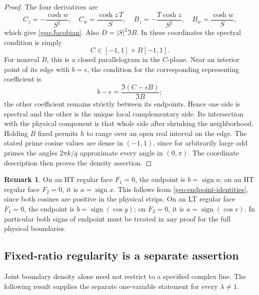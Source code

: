 \documentclass[11pt]{article}
\numberwithin{equation}{section}
\theoremstyle{definition}
\newtheorem{remark}[theorem]{Remark}
\begin{document}
\begin{proof}
The four derivatives are
\[
 C_z=-\frac{\cosh w}{S^2},\quad
 C_w=\frac{\cosh z\,T}{S},\quad
 B_z=-\frac{T\cosh z}{S^2},\quad
 B_w=\frac{\cosh w}{S},
\]
which give \eqref{geo:Jacobian}.
Also \(D=|S|^2\Im B\).  In these coordinates the spectral
condition is simply
\[
                         C\in[-1,1]+B[-1,1].
\]
For nonreal \(B\), this is a closed parallelogram in the
\(C\)-plane.  Near an interior point of its edge with
\(b=\epsilon\), the condition for the corresponding
representing coefficient is
\[
          b-\epsilon=\frac{\Im(C-\epsilon B)}{\Im B};
\]
the other coefficient remains strictly between its
endpoints.  Hence one side is spectral and the other
is the unique local complementary side.  Its intersection
with the physical component is that whole side after
shrinking the neighborhood.
Holding \(B\) fixed permits \(h\) to range over an open
real interval on the edge.  The stated prime cosine
values are dense in \((-1,1)\), since for arbitrarily
large odd primes the angles \(2\pi k/q\) approximate
every angle in \((0,\pi)\).  The coordinate description
then proves the density assertion.
\end{proof}

\begin{remark}\label{geo:endpoint-signs}
On an HT regular face \(F_1=0\), the endpoint is
\(b=\operatorname{sign}u\); on an HT regular face \(F_2=0\),
it is \(a=\operatorname{sign}x\).
This follows from \eqref{geo:endpoint-identities}, since
both cosines are positive in the physical strips.
On an LT regular face \(F_1=0\), the endpoint is
\(b=\operatorname{sign}(\cos y)\); on \(F_2=0\), it is
\(a=\operatorname{sign}(\cos v)\).
In particular both signs of endpoint must be treated in
any proof for the full physical boundaries.
\end{remark}

\subsection{Fixed-ratio regularity is a separate assertion}
\label{geo:slice-regularity-section}

Joint boundary density alone need not restrict to a specified
complex line.  The following result supplies the separate
one-variable statement for every \(\lambda\ne1\).
\end{document}
